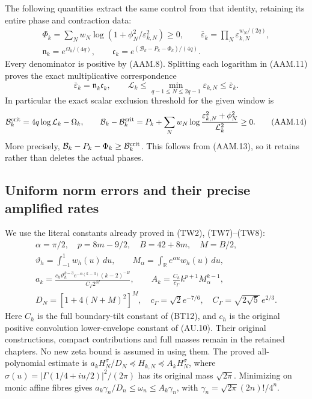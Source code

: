 The following quantities extract the same control from that identity,
retaining its entire phase and contraction data:
\[
 \begin{gathered}
 \Phi_k=\sum_Nw_N\log(1+\phi_N^2/\varepsilon_{k,N}^2)\geq0,
 \qquad
 \overline\varepsilon_k=\prod_N\varepsilon_{k,N}^{w_N/(2q)},\\
 \mathfrak n_k=e^{\Omega_k/(4q)},\qquad
 \mathfrak c_k=e^{(\mathcal B_k-P_k-\Phi_k)/(4q)}.
 \end{gathered}
 \tag{AAM.12}
\]
Every denominator is positive by (AAM.8). Splitting each logarithm
in (AAM.11) proves the exact multiplicative correspondence
\[
 \boxed{\overline\varepsilon_k=\mathfrak n_k\mathfrak c_k,
 \qquad \mathcal L_k\leq\min_{q-1\leq N\leq2q-1}
        \varepsilon_{k,N}\leq\overline\varepsilon_k.}
 \tag{AAM.13}
\]
In particular the exact scalar exclusion threshold for the given
window is
\[
 \mathcal B_k^{\rm crit}=4q\log\mathcal L_k-\Omega_k,\qquad
 \mathcal B_k-\mathcal B_k^{\rm crit}
 =P_k+\sum_Nw_N\log
       \frac{\varepsilon_{k,N}^2+\phi_N^2}{\mathcal L_k^2}\geq0.
 \tag{AAM.14}
\]
More precisely, $\mathcal B_k-P_k-\Phi_k\geq
\mathcal B_k^{\rm crit}$. This follows from (AAM.13), so it
retains rather than deletes the actual phases.

\subsection{Uniform norm errors and their precise amplified rates}

We use the literal constants already proved in (TW2), (TW7)--(TW8):
\[
 \begin{gathered}
 \alpha=\pi/2,\quad p=8m-9/2,\quad B=42+8m,\quad M=B/2,\\
 \vartheta_h=\int_{-1}^{1}w_h(u)\,du,\qquad
 M_\alpha=\int_{\mathbb R}e^{\alpha u}w_h(u)\,du,\\
 a_k=\frac{c_h\vartheta_h^{k-3}e^{-\alpha(k-3)}(k-2)^{-B}}
                 {C_\Gamma2^M},\qquad
 A_k=\frac{C_h}{c_\Gamma}k^{p+1}M_\alpha^{k-1},\\
 D_N=[1+4(N+M)^2]^M,\quad
 c_\Gamma=\sqrt2e^{-7/6},\quad C_\Gamma=\sqrt{2\sqrt5}\,e^{2/3}.
 \end{gathered}
 \tag{AAM.15}
\]
Here $C_h$ is the full boundary-tilt constant of (BT12), and $c_h$
is the original positive convolution lower-envelope constant of
(AU.10). Their original constructions, compact contributions and
full masses remain in the retained chapters. No new zeta bound is
assumed in using them. The proved all-polynomial estimate is
$a_kH_N^\sigma/D_N\preceq H_{k,N}\preceq A_kH_N^\sigma$,
where $\sigma(u)=|\Gamma(1/4+iu/2)|^2/(2\pi)$ has its original
mass $\sqrt{2\pi}$. Minimizing on monic affine fibres gives
$a_k\gamma_n/D_n\leq\omega_n\leq A_k\gamma_n$, with
$\gamma_n=\sqrt{2\pi}(2n)!/4^n$.

